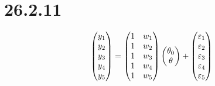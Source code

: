 \section*{26.2.11}
$$\left(\begin{matrix}
y_1\cr
y_2\cr
y_3\cr
y_4\cr
y_5\cr
\end{matrix}\right)=\left(\begin{matrix}
1 & w_1\cr
1 & w_2\cr
1 & w_3\cr
1 & w_4\cr
1 & w_5
\end{matrix}\right)\left(\begin{matrix}
\theta_0\cr
\theta\cr
\end{matrix}\right)+\left(\begin{matrix}
\varepsilon_1\cr
\varepsilon_2\cr
\varepsilon_3\cr
\varepsilon_4\cr
\varepsilon_5
\end{matrix}\right)
$$


